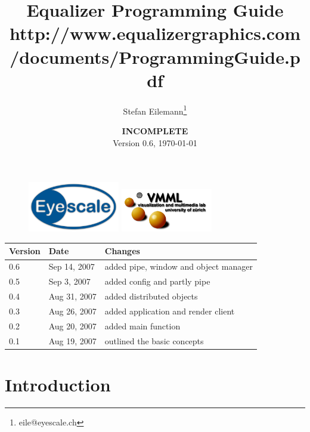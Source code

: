 \documentclass[10pt,a4]{scrartcl}
\title{Equalizer Programming Guide\\
  {\footnotesize\mdseries
    \htmladdnormallink{http://www.equalizergraphics.com/documents/Developer/ProgrammingGuide.pdf}
    {http://www.equalizergraphics.com/documents/ProgrammingGuide.pdf}}
}
\author{Stefan Eilemann\thanks{eile@eyescale.ch}\\[\medskipamount]
}
\date{
  \textbf{INCOMPLETE}\\[\medskipamount]
  Version 0.6, \today
}
\begin{document}
\maketitle
\vfill
\lstset{language=C++}

\thispagestyle{empty}
\begin{figure}[ht]
  \hfill
  \includegraphics[width=4cm]{images/logo.pdf}\hfill
  \includegraphics[width=4cm]{images/vmml.pdf}\hfill\vspace{-1em}\\
\end{figure}
\vfill


\vfill{\center\begin{tabularx}{\textwidth}{|l|l|X|}
    \hline
    \bf Version & \bf Date     & \bf Changes \\
    \hline
    0.6         & Sep 14, 2007 & added pipe, window and object manager\\
    0.5         & Sep 3,  2007 & added config and partly pipe\\
    0.4         & Aug 31, 2007 & added distributed objects\\
    0.3         & Aug 26, 2007 & added application and render client\\
    0.2         & Aug 20, 2007 & added main function\\
    0.1         & Aug 19, 2007 & outlined the basic concepts\\
    \hline
  \end{tabularx}}

\clearpage
\tableofcontents
\thispagestyle{empty}

\clearpage
{}



\section{Introduction}
\end{document}
